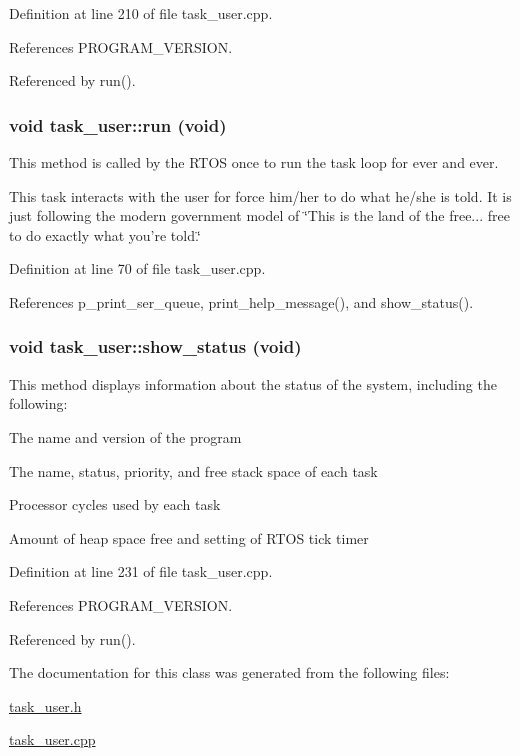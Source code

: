 Definition at line 210 of file task\_\-user.cpp.

References PROGRAM\_\-VERSION.

Referenced by run().\hypertarget{classtask__user_adca6429d57be25e8d411414fc8ad75af}{
\subsubsection[{run}]{\setlength{\rightskip}{0pt plus 5cm}void task\_\-user::run (void)}}
\label{classtask__user_adca6429d57be25e8d411414fc8ad75af}
This method is called by the RTOS once to run the task loop for ever and ever.

This task interacts with the user for force him/her to do what he/she is told. It is just following the modern government model of \char`\"{}This is the land of the free...
  free to do exactly what you're told.\char`\"{} 

Definition at line 70 of file task\_\-user.cpp.

References p\_\-print\_\-ser\_\-queue, print\_\-help\_\-message(), and show\_\-status().\hypertarget{classtask__user_a105bebbd9cb1031154c3dfc3662db4a0}{
\subsubsection[{show\_\-status}]{\setlength{\rightskip}{0pt plus 5cm}void task\_\-user::show\_\-status (void)}}
\label{classtask__user_a105bebbd9cb1031154c3dfc3662db4a0}
This method displays information about the status of the system, including the following: \begin{DoxyItemize}
\item The name and version of the program \item The name, status, priority, and free stack space of each task \item Processor cycles used by each task \item Amount of heap space free and setting of RTOS tick timer \end{DoxyItemize}


Definition at line 231 of file task\_\-user.cpp.

References PROGRAM\_\-VERSION.

Referenced by run().

The documentation for this class was generated from the following files:\begin{DoxyCompactItemize}
\item 
\hyperlink{task__user_8h}{task\_\-user.h}\item 
\hyperlink{task__user_8cpp}{task\_\-user.cpp}\end{DoxyCompactItemize}
